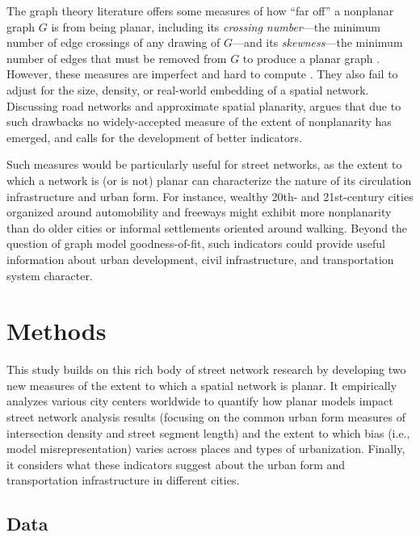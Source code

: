 \documentclass[Afour,doublespace,sageh,times]{sagej}
\begin{document}
The graph theory literature offers some measures of how \enquote{far off} a nonplanar graph $G$ is from being planar, including its \emph{crossing number}---the minimum number of edge crossings of any drawing of $G$---and its \emph{skewness}---the minimum number of edges that must be removed from $G$ to produce a planar graph \citep{liebers_planarizing_2001,chimani_non-planar_2009}. However, these measures are imperfect and hard to compute \citep{szekely_successful_2004,chimani_vertex_2012}. They also fail to adjust for the size, density, or real-world embedding of a spatial network. Discussing road networks and approximate spatial planarity, \citet[p.~133]{newman_networks:_2010} argues that due to such drawbacks no widely-accepted measure of the extent of nonplanarity has emerged, and calls for the development of better indicators.

Such measures would be particularly useful for street networks, as the extent to which a network is (or is not) planar can characterize the nature of its circulation infrastructure and urban form. For instance, wealthy 20th- and 21st-century cities organized around automobility and freeways might exhibit more nonplanarity than do older cities or informal settlements oriented around walking. Beyond the question of graph model goodness-of-fit, such indicators could provide useful information about urban development, civil infrastructure, and transportation system character.



\section{Methods}

This study builds on this rich body of street network research by developing two new measures of the extent to which a spatial network is planar. It empirically analyzes various city centers worldwide to quantify how planar models impact street network analysis results (focusing on the common urban form measures of intersection density and street segment length) and the extent to which bias (i.e., model misrepresentation) varies across places and types of urbanization. Finally, it considers what these indicators suggest about the urban form and transportation infrastructure in different cities.

\subsection{Data}
\end{document}
